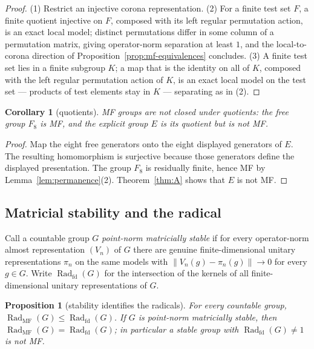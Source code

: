 \documentclass[11pt]{amsart}
\newcommand{\leanverified}[2]{\ignorespaces}
\newtheorem{proposition}[theorem]{Proposition}
\newtheorem{corollary}[theorem]{Corollary}
\theoremstyle{definition}
\theoremstyle{remark}
\theoremstyle{plain}
\newcommand{\opnorm}[1]{\left\lVert #1\right\rVert}
\begin{document}
\begin{proof}
(1)  Restrict an injective corona representation.  (2)  For a finite
test set $F$, a finite quotient injective on $F$, composed with its
left regular permutation action, is an exact local model; distinct
permutations differ in some column of a permutation matrix, giving
operator-norm separation at least $1$, and the local-to-corona
direction of Proposition~\ref{prop:mf-equivalences} concludes.
(3)  A finite test set lies in a finite subgroup $K$; a map that is
the identity on all of $K$, composed with the left regular permutation
action of $K$, is an exact local model on the test set --- products of
test elements stay in $K$ --- separating as in (2).
\end{proof}

\begin{corollary}[quotients]\label{cor:quotclosure}
MF groups are not closed under quotients: the free group
\(F_8\) is MF, and the explicit group \(E\) is its quotient
but is not MF.
\leanverified{Sofic/LiteralMFQuotientControls}{GroupApproximation.LiteralMFQuotientControls.manuscriptQuotientNonclosure}
\end{corollary}

\begin{proof}
Map the eight free generators onto the eight displayed generators of \(E\).
The resulting homomorphism is surjective because those generators define the
displayed presentation.  The group \(F_8\) is residually finite, hence MF by
Lemma~\ref{lem:permanence}(2).  Theorem~\ref{thm:A} shows that \(E\) is not MF.
\end{proof}


\subsection{Matricial stability and the radical}\label{subsec:stability}

Call a countable group $G$ \emph{point-norm matricially stable} if for
every operator-norm almost representation $(V_n)$ of $G$ there are
genuine finite-dimensional unitary representations $\pi_n$ on the same
models with $\opnorm{V_n(g)-\pi_n(g)}\to0$ for every $g\in G$.
Write $\operatorname{Rad}_{\mathrm{fd}}(G)$ for the intersection of
the kernels of all finite-dimensional unitary representations of $G$.

\begin{proposition}[stability identifies the radicals]\label{prop:stabradical}
For every countable group,
$\operatorname{Rad}_{\mathrm{MF}}(G)\le\operatorname{Rad}_{\mathrm{fd}}(G)$.
If $G$ is point-norm matricially stable, then
$\operatorname{Rad}_{\mathrm{MF}}(G)=\operatorname{Rad}_{\mathrm{fd}}(G)$;
in particular a stable group with
$\operatorname{Rad}_{\mathrm{fd}}(G)\neq1$ is not MF.
\leanverified{Sofic/MatricialStabilityRadical}{GroupApproximation.MatricialStabilityRadical.actualCoronaMFResidual_le_fdUnitaryResidual}
\leanverified{Sofic/MatricialStabilityRadical}{GroupApproximation.MatricialStabilityRadical.actualCoronaMFResidual_eq_fdUnitaryResidual}
\leanverified{Sofic/MatricialStabilityRadical}{GroupApproximation.MatricialStabilityRadical.not_isCDEOperatorMF_of_stable_of_fdResidual_ne_bot}
\end{proposition}
\end{document}
